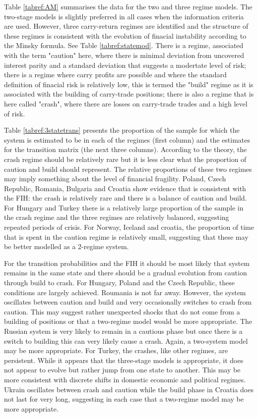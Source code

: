\documentclass[12pt, a4paper, oneside]{article} %
\begin{document}
Table \ref{tabref:AM} summarises the data for the two and three regime models.  The two-stage models is slightly preferred in all cases when the information criteria are used.  However, three carry-return regimes are identified and the structure of these regimes is consistent with the evolution of finacial instability according to the Minsky formula.  See Table \ref{tabref:statemod}.  There is a regime, associated with the term "caution" here, where there is minimal deviation from uncovered interest parity and a standard deviation that suggests a modertate level of risk; there is a regime where carry profits are possible and where the standard definition of finacial risk is relatively low, this is termed the "build" regime as it is associated with the building of carry-trade positions; there is also a regime that is here called "crash", where there are losses on carry-trade trades and a high level of risk. 

Table \ref{tabref:3statetrans} presents the proportion of the sample for which the system is estimated to be in each of the regimes (first column) and the estimates for the transition matrix (the next three columns).  According to the theory, the crash regime should be relatively rare but it is less clear what the proportion of caution and build should represent.  The relative proportions of these two regimes may imply something about the level of financial fragility.  Poland, Czech Republic, Romania, Bulgaria and Croatia show evidence that is consistent with the FIH: the crash is relatively rare and there is a balance of caution and build.  For Hungary and Turkey there is a relatively large proportion of the sample in the crash regime and the three regimes are relatively balanced, suggesting repeated periods of crisis.  For Norway, Iceland and croatia, the proportion of time that is spent in the caution regime is relatively small, suggesting that these may be better modelled as a 2-regime system.  

For the transition probabilities and the FIH it should be most likely that system remains in the same state and there should be a gradual evolution from caution through build to crash.  For Hungary, Poland and the Czech Republic, these conditions are largely achieved.  Roumania is not far away.  However, the system oscillates between caution and build and very occasionally switches to crash from caution.  This may suggest rather unexpected shocks that do not come from a building of positions or that a two-regime model would be more appropriate. The Russian system is very likely to remain in a cautious phase but once there is a switch to building this can very likely cause a crash.  Again, a two-system model may be more appropriate. For Turkey, the crashes, like other regimes, are persistent.  While it appears that the three-stage models is appropriate, it does not appear to evolve but rather jump from one state to another.  This may be more consistent with discrete shifts in domestic economic and political regimes. Ukrain oscillates between crash and caution while the build phase in Croatia does not last for very long, suggesting in each case that a two-regime model may be more appropriate. 
\end{document}
